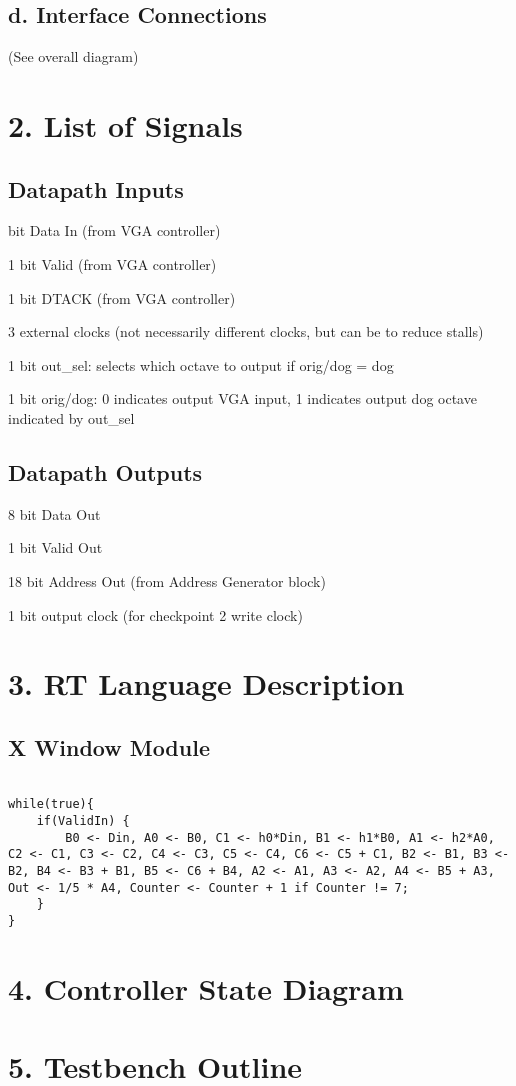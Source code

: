 \documentclass[11pt]{article}
\begin{document}
\subsection*{d. Interface Connections}

(See overall diagram)

\section*{2. List of Signals}

\subsection*{Datapath Inputs}

 bit Data In (from VGA controller)

1 bit Valid  (from VGA controller)

1 bit DTACK (from VGA controller)

3 external clocks (not necessarily different clocks, but can be to reduce stalls)

1 bit out\_sel: selects which octave to output if orig/dog = dog

1 bit orig/dog: 0 indicates output VGA input, 1 indicates output dog octave indicated by out\_sel

\subsection*{Datapath Outputs}

8 bit Data Out

1 bit Valid Out

18 bit Address Out (from Address Generator block)

1 bit output clock (for checkpoint 2 write clock)

\section*{3. RT Language Description}

\subsection*{X Window Module}
\begin{lstlisting}

while(true){
    if(ValidIn) {
        B0 <- Din, A0 <- B0, C1 <- h0*Din, B1 <- h1*B0, A1 <- h2*A0, C2 <- C1, C3 <- C2, C4 <- C3, C5 <- C4, C6 <- C5 + C1, B2 <- B1, B3 <- B2, B4 <- B3 + B1, B5 <- C6 + B4, A2 <- A1, A3 <- A2, A4 <- B5 + A3, Out <- 1/5 * A4, Counter <- Counter + 1 if Counter != 7;
    }
}
\end{lstlisting}


\section*{4. Controller State Diagram}

\section*{5. Testbench Outline}
\end{document}
